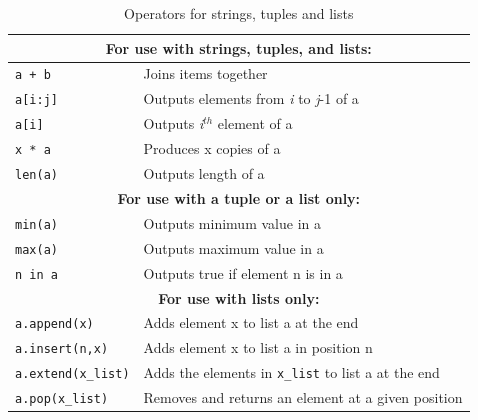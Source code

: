 \begin{table}[H]
\begin{center}
\begin{tabular}{|l | p{6.5cm}|}
\hline
\multicolumn{2}{|c|}{\textbf{For use with strings, tuples, and lists:}} \\\hline
\texttt{a + b} & Joins items together\\\hline
\texttt{a[i:j]} & Outputs elements from \textit{i} to \textit{j}-1 of a \\\hline
\texttt{a[i]} & Outputs \textit{i}$^{th}$ element of a\\\hline
\texttt{x * a} & Produces x copies of a\\\hline
\texttt{len(a)} & Outputs length of a \\\hline
\multicolumn{2}{|c|}{\textbf{For use with a tuple or a list only:}} \\\hline
\texttt{min(a)} & Outputs minimum value in a\\\hline
\texttt{max(a)} & Outputs maximum value in a\\\hline
\texttt{n in a} & Outputs true if element n is in a\\\hline
\multicolumn{2}{|c|}{\textbf{For use with lists only:}} \\\hline
\texttt{a.append(x)} & Adds element x to list a at the end\\\hline
\texttt{a.insert(n,x)} & Adds element x to list a in position n\\\hline
\texttt{a.extend(x\_list)} & Adds the elements in \texttt{x\_list} to list a at the end\\\hline
\texttt{a.pop(x\_list)} & Removes and returns an element at a given position\\\hline
\end{tabular}
\end{center}
\caption {Operators for strings, tuples and lists}
\label{StringTab}
\end{table}

